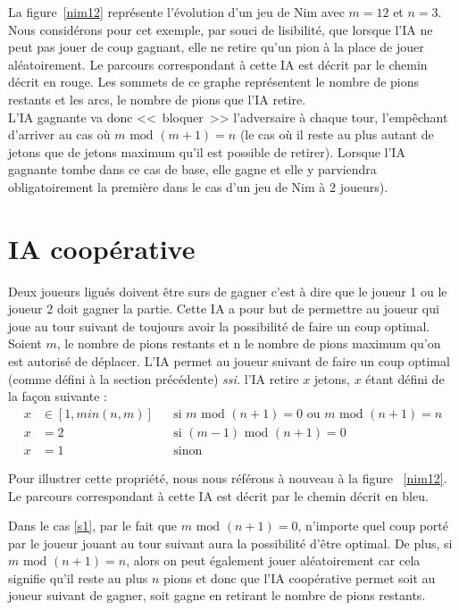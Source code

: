 \documentclass[10pt,a4paper]{article}
\newcommand{\ssi}{\textit{ssi. }}
\renewcommand{\mod}{\text{ mod }}
\begin{document}
La figure~\ref{nim12} représente l'évolution d'un jeu de Nim avec $m=12$ et
$n=3$. Nous considérons pour cet exemple, par souci de lisibilité, que lorsque
l'IA ne peut pas jouer de coup gagnant, elle ne retire qu'un pion à la place de
jouer aléatoirement. Le parcours correspondant à cette IA est décrit par le
chemin décrit en {\color{red} rouge}. Les sommets de ce graphe représentent le
nombre de pions restants et les arcs, le nombre de pions que l'IA retire. \\
L'IA gagnante va donc <<~bloquer~>> l'adversaire à chaque tour, l'empêchant
d'arriver au cas où $m \mod (m+1) = n$ (le cas où il reste au plus autant de
jetons que de jetons maximum qu'il est possible de retirer). Lorsque l'IA
gagnante tombe dans ce cas de base, elle gagne et elle y parviendra
obligatoirement la première dans le cas d'un jeu de Nim à 2 joueurs).

\section{IA coopérative}
Deux joueurs ligués doivent être surs de gagner c'est à dire que le joueur 1 ou
le joueur 2 doit gagner la partie. Cette IA a pour but de permettre au joueur
qui joue au tour suivant de toujours avoir la possibilité de faire un coup
optimal. Soient $m$, le nombre de pions restants et n le nombre de pions maximum
qu'on est autorisé de déplacer. L'IA permet au joueur suivant de faire un coup
optimal (comme défini à la section précédente) \ssi l'IA retire $x$
jetons, $x$ étant défini de la façon suivante :
\begin{align}
	x &\in [1, min(n, m)] &&
	\text{si } m \mod (n+1) = 0 \text{ ou } m \mod (n+1) = n \label{s1} \\
	x &= 2 && \text{si } (m-1) \mod (n+1) = 0 \label{s2} \\
	x &= 1 && \text{sinon} \label{s3}
\end{align}

Pour illustrer cette propriété, nous nous référons à nouveau à la figure
~\ref{nim12}. Le parcours correspondant à cette IA est décrit par le chemin
décrit en {\color{blue} bleu}.

Dans le cas \eqref{s1}, par le fait que
$m \mod (n+1)=0$, n'importe quel coup porté par le joueur jouant au tour
suivant aura la possibilité d'être optimal. De plus, si $m \mod (n+1) = n$, alors
on peut également jouer aléatoirement car cela signifie qu'il reste au plus $n$
pions et donc que l'IA coopérative permet soit au joueur suivant de gagner, soit
gagne en retirant le nombre de pions restants.
\end{document}
